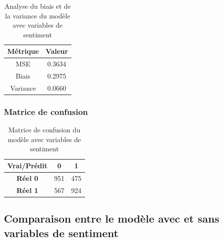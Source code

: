 \documentclass[a4paper,12pt]{article}
\begin{document}
\begin{table}[H]

\centering

\begin{tabular}{|c|c|}

\hline

\textbf{Métrique} & \textbf{Valeur} \\ \hline

MSE & 0.3634 \\ \hline

Biais & 0.2975 \\ \hline

Variance & 0.0660 \\ \hline

\end{tabular}

\caption{Analyse du biais et de la variance du modèle avec variables de sentiment}

\end{table}
 
\bigskip
 
\subsubsection{Matrice de confusion}
 
\begin{table}[H]

\centering

\begin{tabular}{|c|c|c|}

\hline

\textbf{Vrai/Prédit} & 0 & 1 \\ \hline

\textbf{Réel 0} & 951 & 475 \\ \hline

\textbf{Réel 1} & 567 & 924 \\ \hline

\end{tabular}

\caption{Matrice de confusion du modèle avec variables de sentiment}

\end{table}
 
\bigskip
 
\subsection{Comparaison entre le modèle avec et sans variables de sentiment}
 
\end{document}
